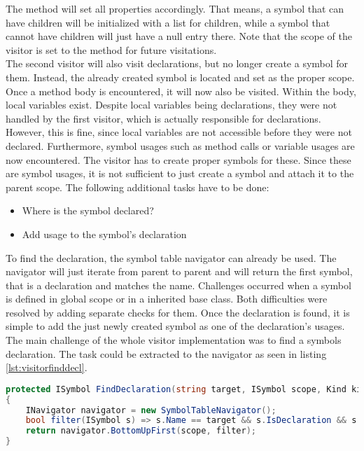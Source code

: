 The  method will set all properties accordingly.
That means, a symbol that can have children will be initialized with a list for children, while a symbol that cannot have children will just have a null entry there.
Note that the scope of the visitor is set to the method for future visitations.\\

The second visitor will also visit declarations, but no longer create a symbol for them.
Instead, the already created symbol is located and set as the proper scope.
Once a method body is encountered, it will now also be visited.
Within the body, local variables exist.
Despite local variables being declarations, they were not handled by the first visitor, which is actually responsible for declarations.
However, this is fine, since local variables are not accessible before they were not declared.
Furthermore, symbol usages such as method calls or variable usages are now encountered.
The visitor has to create proper symbols for these.
Since these are symbol usages, it is not sufficient to just create a symbol and attach it to the parent scope.
The following additional tasks have to be done:
\begin{itemize}
    \item Where is the symbol declared?
    \item Add usage to the symbol's declaration
\end{itemize}

To find the declaration, the symbol table navigator can already be used.
The navigator will just iterate from parent to parent and will return the first symbol, that is a declaration and matches the name.
Challenges occurred when a symbol is defined in global scope or in a inherited base class.
Both difficulties were resolved by adding separate checks for them.
Once the declaration is found, it is simple to add the just newly created symbol as one of the declaration's usages.\\

The main challenge of the whole visitor implementation was to find a symbols declaration.
The task could be extracted to the navigator as seen in listing \ref{lst:visitorfinddecl}.

\begin{lstlisting}[language=csharp, caption={Finding a Declaration}, captionpos=b, label={lst:visitorfinddecl}]
protected ISymbol FindDeclaration(string target, ISymbol scope, Kind kind)
{
    INavigator navigator = new SymbolTableNavigator();
    bool filter(ISymbol s) => s.Name == target && s.IsDeclaration && s.Kind == kind;
    return navigator.BottomUpFirst(scope, filter);
}
\end{lstlisting}

